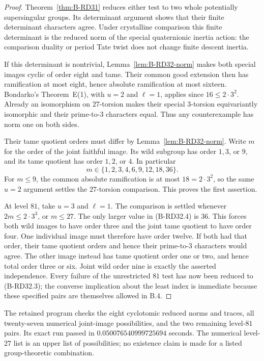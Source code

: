 \begin{proof}
Theorem~\ref{thm:B-RD31} reduces either test to two whole
potentially supersingular groups. Its determinant argument
shows that their finite determinant characters agree.
Under crystalline comparison this finite determinant is
the reduced norm of the special quaternionic inertia
action: the comparison duality or period Tate twist does
not change finite descent inertia.

If this determinant is nontrivial, Lemma~\ref{lem:B-RD32-norm}
makes both special images cyclic of order eight and tame.
Their common good extension then has ramification at most
eight, hence absolute ramification at most sixteen.
Bondarko's Theorem~E(1), with $u=2$ and $\ell=1$, applies
since $16\leq2\cdot3^2$. Already an isomorphism on
$27$-torsion makes their special $3$-torsion equivariantly
isomorphic and their prime-to-$3$ characters equal.
Thus any counterexample has norm one on both sides.

Their tame quotient orders must differ by
Lemma~\ref{lem:B-RD32-norm}. Write $m$ for the order of
the joint faithful image. Its wild subgroup has order
$1,3$, or $9$, and its tame quotient has order $1,2$, or
$4$. In particular
\[
                m\in\{1,2,3,4,6,9,12,18,36\}.
                                                        \tag{B-RD32.4}
\]
For $m\leq9$, the common absolute ramification is at most
$18=2\cdot3^2$, so the same $u=2$ argument settles the
$27$-torsion comparison. This proves the first assertion.

At level $81$, take $u=3$ and $\ell=1$. The comparison is
settled whenever $2m\leq2\cdot3^3$, or $m\leq27$.
The only larger value in (B-RD32.4) is $36$. This forces
both wild images to have order three and the joint tame
quotient to have order four. One individual image must
therefore have order twelve. If both had that order,
their tame quotient orders and hence their prime-to-$3$
characters would agree. The other image instead has
tame quotient order one or two, and hence total order
three or six. Joint wild order nine is exactly the
asserted independence. Every failure of the unrestricted
$81$ test has now been reduced to (B-RD32.3); the converse
implication about the least index is immediate because
these specified pairs are themselves allowed in B.4.
\end{proof}

\begin{remark}\label{auto:B:72e408a14989}

The retained program
checks the eight cyclotomic reduced norms and traces, all twenty-seven
numerical joint-image possibilities, and the two remaining level-$81$
pairs. Its exact run passed in $0.050076540999725694$ seconds.
The numerical level-$27$ list is an upper list of possibilities; no
existence claim is made for a listed group-theoretic combination.
\end{remark}

